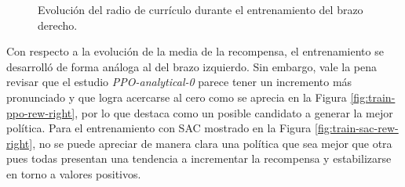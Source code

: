 \begin{figure}[h!]
	\caption{Evolución del radio de currículo durante el entrenamiento del brazo derecho.}
	\label{fig:train-curr-right}
\end{figure}

Con respecto a la evolución de la media de la recompensa, el entrenamiento se desarrolló de forma análoga al del brazo izquierdo. Sin embargo, vale la pena revisar que el estudio \emph{PPO-analytical-0} parece tener un incremento más pronunciado y que logra acercarse al cero como se aprecia en la Figura \ref{fig:train-ppo-rew-right}, por lo que destaca como un posible candidato a generar la mejor política. Para el entrenamiento con SAC mostrado en la Figura \ref{fig:train-sac-rew-right}, no se puede apreciar de manera clara una política que sea mejor que otra pues todas presentan una tendencia a incrementar la recompensa y estabilizarse en torno a valores positivos.

